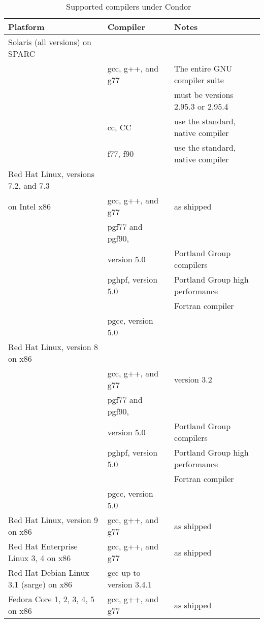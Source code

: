 \begin{center}
\begin{table}[hbt]
\begin{tabular}{|ll|l|} \hline
\textbf{Platform} & \textbf{Compiler} & \textbf{Notes}\\ \hline \hline
Solaris (all versions) on SPARC & & \\ 
& gcc, g++, and g77 & The entire GNU compiler suite \\
& & must be versions 2.95.3 or 2.95.4 \\ 
& cc, CC & use the standard, native compiler \\ 
& f77, f90 & use the standard, native compiler \\ 
\hline
Red Hat Linux, versions 7.2, and 7.3 & & \\
on Intel x86 & gcc, g++, and g77 & as shipped \\ 
& pgf77 and pgf90, & \\
& version 5.0 & Portland Group compilers \\ 
& pghpf, version 5.0 & Portland Group high performance \\
& & Fortran compiler \\ 
& pgcc, version 5.0 & \\ 
\hline
Red Hat Linux, version 8 on x86 & & \\ 
& gcc, g++, and g77 & version 3.2 \\ 
& pgf77 and pgf90, & \\
& version 5.0 & Portland Group compilers \\ 
& pghpf, version 5.0 & Portland Group high performance \\
& & Fortran compiler \\ 
& pgcc, version 5.0 & \\ 
\hline
Red Hat Linux, version 9 on x86 & gcc, g++, and g77 & as shipped  \\ 
\hline
Red Hat Enterprise Linux 3, 4 on x86 & gcc, g++, and g77 & as shipped  \\ 
\hline
Red Hat Debian Linux 3.1 (sarge) on x86 & gcc up to version 3.4.1 &  \\ 
\hline
Fedora Core 1, 2, 3, 4, 5 on x86 & gcc, g++, and g77 & as shipped  \\ 
\hline
\end{tabular}
\caption{\label{supported-compile}Supported compilers under Condor \VersionNotice\ }
\end{table}
\end{center}

